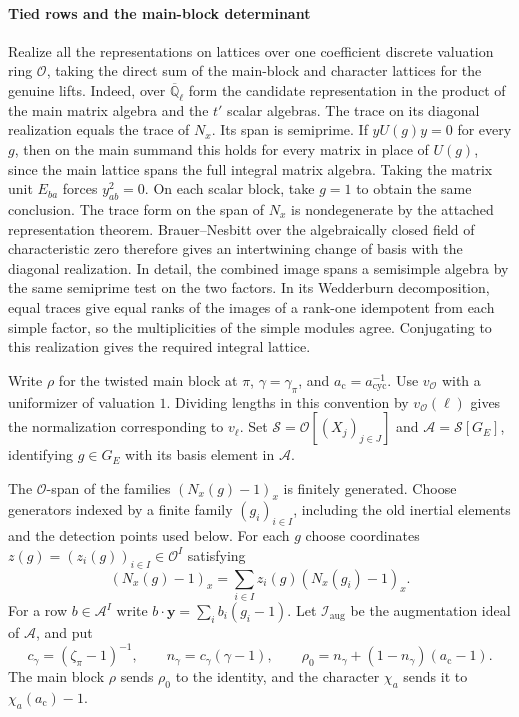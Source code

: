 \paragraph{Tied rows and the main-block determinant}
Realize all the representations on lattices over one coefficient
discrete valuation ring \(\mathcal O\), taking the direct sum of the
main-block and character lattices for the genuine lifts.
Indeed, over \(\overline{\mathbb Q}_\ell\) form the candidate representation in the
product of the main matrix algebra and the \(t'\) scalar algebras. The trace on its
diagonal realization equals the trace of \(N_x\). Its span is semiprime.
If \(yU(g)y=0\) for every \(g\), then on the main summand this holds for every matrix in
place of \(U(g)\), since the main lattice spans the full integral matrix algebra.
Taking the matrix unit \(E_{ba}\) forces \(y_{ab}^2=0\).
On each scalar block, take \(g=1\) to obtain the same conclusion.
The trace form on the span of \(N_x\) is nondegenerate by the attached representation theorem.
Brauer--Nesbitt over the algebraically closed field of characteristic zero
therefore gives an intertwining change of basis with the diagonal realization.
In detail, the combined image spans a semisimple algebra by the same semiprime test
on the two factors. In its Wedderburn decomposition, equal traces give equal ranks of
the images of a rank-one idempotent from each simple factor, so the multiplicities of
the simple modules agree. Conjugating to this realization gives the required integral lattice.

Write \(\rho\) for the twisted main block at \(\pi\),
\(\gamma=\gamma_\pi\), and \(a_{\mathrm c}=a_{\mathrm{cyc}}^{-1}\).
Use \(v_{\mathcal O}\) with a uniformizer of valuation \(1\).
Dividing lengths in this convention by \(v_{\mathcal O}(\ell)\)
gives the normalization corresponding to \(v_\ell\).
Set \(\mathcal S=\mathcal O[(X_j)_{j\in J}]\) and
\(\mathcal A=\mathcal S[G_E]\), identifying \(g\in G_E\) with its
basis element in \(\mathcal A\).

The \(\mathcal O\)-span of the families \((N_x(g)-1)_x\) is finitely
generated. Choose generators indexed by a finite family \((g_i)_{i\in I}\),
including the old inertial elements and the detection points used below.
For each \(g\) choose coordinates \(z(g)=(z_i(g))_{i\in I}\in\mathcal O^I\)
satisfying
\[
 (N_x(g)-1)_x=\sum_{i\in I} z_i(g)(N_x(g_i)-1)_x .
\]
For a row \(b\in\mathcal A^I\) write \(b\cdot\mathbf y=\sum_i b_i(g_i-1)\).
Let \(\mathcal I_\mathrm{aug}\) be the augmentation ideal of \(\mathcal A\), and put
\[
 c_\gamma=(\zeta_\pi-1)^{-1},\qquad n_\gamma=c_\gamma(\gamma-1),
 \qquad \rho_0=n_\gamma+(1-n_\gamma)(a_{\mathrm c}-1).
\]
The main block \(\rho\) sends \(\rho_0\) to the identity, and the
character \(\chi_a\) sends it to \(\chi_a(a_{\mathrm c})-1\).

